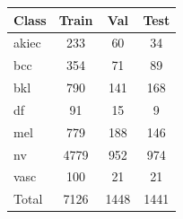 \begin{tabular}{@{}lccc@{}}
\toprule
Class & Train & Val & Test \\ \midrule
akiec & 233 & 60 & 34 \\
bcc & 354 & 71 & 89 \\
bkl & 790 & 141 & 168 \\
df & 91 & 15 & 9 \\
mel & 779 & 188 & 146 \\
nv & 4779 & 952 & 974 \\
vasc & 100 & 21 & 21 \\
\midrule
Total & 7126 & 1448 & 1441 \\
\bottomrule
\end{tabular}
